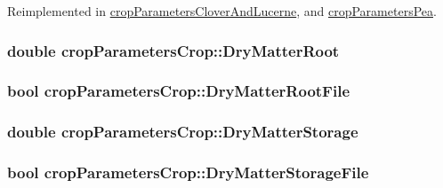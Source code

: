 Reimplemented in \hyperlink{classcrop_parameters_clover_and_lucerne_a2f07df5186a02c4549c039622e3485aa}{cropParametersCloverAndLucerne}, and \hyperlink{classcrop_parameters_pea_a9c85f8f0711af306a638f8fb81bb94a8}{cropParametersPea}.\hypertarget{classcrop_parameters_crop_a9a309c8343b6202ca7e4f463cd2001b0}{
\subsubsection[{DryMatterRoot}]{\setlength{\rightskip}{0pt plus 5cm}double {\bf cropParametersCrop::DryMatterRoot}}}
\label{classcrop_parameters_crop_a9a309c8343b6202ca7e4f463cd2001b0}
\hypertarget{classcrop_parameters_crop_a35b09e89e45d0141635157fdedda5c61}{
\subsubsection[{DryMatterRootFile}]{\setlength{\rightskip}{0pt plus 5cm}bool {\bf cropParametersCrop::DryMatterRootFile}}}
\label{classcrop_parameters_crop_a35b09e89e45d0141635157fdedda5c61}
\hypertarget{classcrop_parameters_crop_aff0c3e5f1b15d1ae41a268c2f8a669cd}{
\subsubsection[{DryMatterStorage}]{\setlength{\rightskip}{0pt plus 5cm}double {\bf cropParametersCrop::DryMatterStorage}}}
\label{classcrop_parameters_crop_aff0c3e5f1b15d1ae41a268c2f8a669cd}
\hypertarget{classcrop_parameters_crop_a5e29396febd09908d9ca07d2ab5103ec}{
\subsubsection[{DryMatterStorageFile}]{\setlength{\rightskip}{0pt plus 5cm}bool {\bf cropParametersCrop::DryMatterStorageFile}}}
\label{classcrop_parameters_crop_a5e29396febd09908d9ca07d2ab5103ec}
